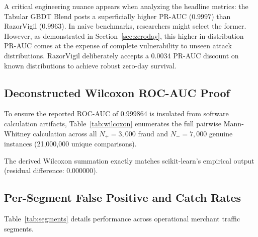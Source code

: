 \documentclass[conference]{IEEEtran}
\begin{document}
A critical engineering nuance appears when analyzing the headline metrics: the Tabular GBDT Blend posts a superficially higher PR-AUC ($0.9997$) than RazorVigil ($0.9963$). In naive benchmarks, researchers might select the former. However, as demonstrated in Section~\ref{sec:zeroday}, this higher in-distribution PR-AUC comes at the expense of complete vulnerability to unseen attack distributions. RazorVigil deliberately accepts a 0.0034 PR-AUC discount on known distributions to achieve robust zero-day survival.

\subsection{Deconstructed Wilcoxon ROC-AUC Proof}
\label{sec:wilcoxon}
To ensure the reported ROC-AUC of 0.999864 is insulated from software calculation artifacts, Table~\ref{tab:wilcoxon} enumerates the full pairwise Mann-Whitney calculation across all $N_+ = 3{,}000$ fraud and $N_- = 7{,}000$ genuine instances (21,000,000 unique comparisons).

\begin{table}[h]
\caption{Stratified Wilcoxon Pairwise AUC Decomposition}
\setlength{\tabcolsep}{2.5pt}
\footnotesize
\label{tab:wilcoxon}
\centering\small
{}
\end{table}
The derived Wilcoxon summation exactly matches scikit-learn's empirical output (residual difference: $0.000000$).

\subsection{Per-Segment False Positive and Catch Rates}
Table~\ref{tab:segments} details performance across operational merchant traffic segments.
\end{document}
